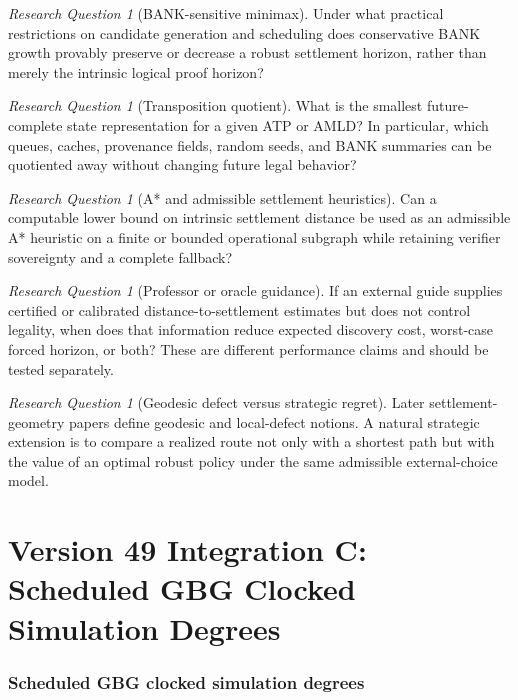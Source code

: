 \documentclass[11pt]{article}
\theoremstyle{remark}
\newtheorem{question}[definition]{Research Question}
\begin{document}
\begin{question}[BANK-sensitive minimax]
Under what practical restrictions on candidate generation and scheduling does conservative BANK growth provably preserve or decrease a robust settlement horizon, rather than merely the intrinsic logical proof horizon?
\end{question}

\begin{question}[Transposition quotient]
What is the smallest future-complete state representation for a given ATP or AMLD? In particular, which queues, caches, provenance fields, random seeds, and BANK summaries can be quotiented away without changing future legal behavior?
\end{question}

\begin{question}[A* and admissible settlement heuristics]
Can a computable lower bound on intrinsic settlement distance be used as an admissible A* heuristic on a finite or bounded operational subgraph while retaining verifier sovereignty and a complete fallback?
\end{question}

\begin{question}[Professor or oracle guidance]
If an external guide supplies certified or calibrated distance-to-settlement estimates but does not control legality, when does that information reduce expected discovery cost, worst-case forced horizon, or both? These are different performance claims and should be tested separately.
\end{question}

\begin{question}[Geodesic defect versus strategic regret]
Later settlement-geometry papers define geodesic and local-defect notions. A natural strategic extension is to compare a realized route not only with a shortest path but with the value of an optimal robust policy under the same admissible external-choice model.
\end{question}



\clearpage
\part*{Version 49 Integration C: Scheduled GBG Clocked Simulation Degrees}

\section{Scheduled GBG clocked simulation degrees}
\end{document}
